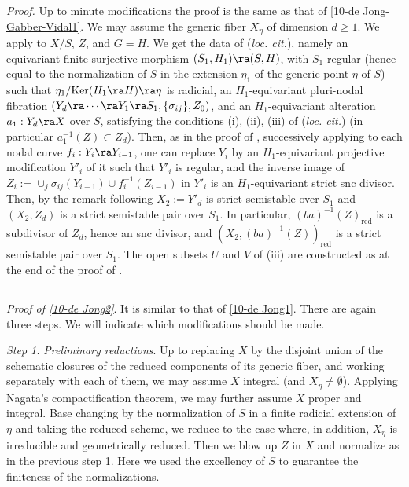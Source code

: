 \documentclass[10pt]{../fichiers-configuration-latex/smfart}
\begin{document}
\medskip \textit{Proof.} Up to minute modifications the proof is the
same as that of \ref{10-de Jong-Gabber-Vidal1}. We may assume the generic
fiber $X_{\eta}$ of dimension $d \ge 1$. We apply \cite[4.4.3]{BS@Vidal}
to $X/S$, $Z$, and $G = H$. We get the data of (\textit{loc. cit.}), namely
an equivariant finite surjective morphism $(S_1, H_1) \ra (S,H)$, with $S_1$
regular (hence equal to the normalization of $S$ in the extension $\eta_1$
of the generic point $\eta$ of $S$) such that $\eta_1/\mathrm{Ker}(H_1 \ra H)
\ra \eta$ is radicial, an $H_1$-equivariant pluri-nodal fibration $(Y_d \ra
\cdots \ra Y_1 \ra S_1, \{ \sigma_{ij} \}, Z_0)$, and an $H_1$-equivariant
alteration $a_1 : Y_d \ra X$ over $S$, satisfying the conditions (i),
(ii), (iii) of (\textit{loc. cit.}) (in particular $a_1^{-1}(Z) \subset
Z_d$). Then, as in the proof of \cite[4.4.1]{BS@Vidal}, successively applying
\cite[4.4.4]{BS@Vidal} to each nodal curve $f_i : Y_i \ra Y_{i-1}$, one
can replace $Y_i$ by an $H_1$-equivariant projective modification $Y'_i$
of it such that $Y'_i$ is regular, and the inverse image of $Z_i := \cup_j
\sigma_{ij}(Y_{i-1}) \cup f_i^{-1}(Z_{i-1})$ in $Y'_i$ is an $H_1$-equivariant
strict snc divisor. Then, by the remark following \cite[4.4.4]{BS@Vidal} $X_2
:= Y'_d$ is strict semistable over $S_1$ and $(X_2,Z_d)$ is a strict semistable
pair over $S_1$. In particular, $(ba)^{-1}(Z)_{\mathrm{red}}$ is a subdivisor
of $Z_d$, hence an snc divisor, and $(X_2,(ba)^{-1}(Z))_{\mathrm{red}}$ is
a strict semistable pair over $S_1$. The open subsets $U$ and $V$ of (iii)
are constructed as at the end of the proof of \cite[4.4.1]{BS@Vidal}.

\subsection{}\label{10-proof of de Jong2} \textit{Proof of \ref{10-de
Jong2}}. It is similar to that of \ref{10-de Jong1}. There are again three
steps. We will indicate which modifications should be made.

\medskip \textit{Step 1.} \textit{Preliminary reductions}. Up to replacing $X$
by the disjoint union of the schematic closures of the reduced components of
its generic fiber, and working separately with each of them, we may assume $X$
integral (and $X_{\eta} \ne \emptyset$). Applying Nagata's compactification
theorem, we may further assume $X$ proper and integral.  Base changing by
the normalization of $S$ in a finite radicial extension of $\eta$ and taking
the reduced scheme, we reduce to the case where, in addition, $X_{\eta}$
is irreducible and geometrically reduced. Then we blow up $Z$ in $X$ and
normalize as in the previous step 1. Here we used the excellency of $S$
to guarantee the finiteness of the normalizations.
\end{document}
